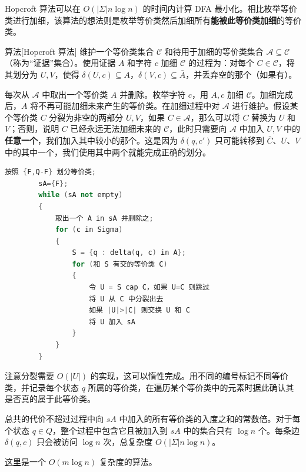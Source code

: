 Hopcroft 算法可以在 $O(|\Sigma|n\log n)$ 的时间内计算 DFA 最小化。相比枚举等价类进行加细，该算法的想法则是枚举等价类然后加细所有\textbf{能被此等价类加细}的等价类。

\begin{descbox}{算法}[Hopcroft 算法]
    维护一个等价类集合 $\mathcal C$ 和待用于加细的等价类集合 $\mathcal A\subseteq \mathcal C$（称为“证据”集合）。使用证据 $A$ 和字符 $c$ 加细 $\mathcal C$ 的过程为：对每个 $C\in \mathcal C$，将其划分为 $U,V$，使得 $\delta(U,c)\subseteq A$，$\delta(V,c)\subseteq \bar A$，并丢弃空的那个（如果有）。
    
    

    每次从 $\mathcal A$ 中取出一个等价类 $A$ 并删除。枚举字符 $c$，用 $A,c$ 加细 $\mathcal C$。加细完成后，$A$ 将不再可能加细未来产生的等价类。在加细过程中对 $\mathcal A$ 进行维护。假设某个等价类 $C$ 分裂为非空的两部分 $U,V$，如果 $C\in \mathcal A$，那么可以将 $C$ 替换为 $U$ 和 $V$；否则，说明 $C$ 已经永远无法加细未来的 $\mathcal C$，此时只需要向 $\mathcal A$ 中加入 $U,V$ 中的\textbf{任意一个}，我们加入其中较小的那个。这是因为 $\delta(q,c')$ 只可能转移到 $\bar C$、$U$、$V$ 中的其中一个，我们使用其中两个就能完成正确的划分。
    \begin{lstlisting}[language=C++]
        按照 {F,Q-F} 划分等价类;
        sA={F};
        while (sA not empty) 
        {
            取出一个 A in sA 并删除之;
            for (c in Sigma)
            {
                S = {q : delta(q, c) in A};
                for (和 S 有交的等价类 C) 
                {
                    令 U = S cap C，如果 U=C 则跳过
                    将 U 从 C 中分裂出去
                    如果 |U|>|C| 则交换 U 和 C
                    将 U 加入 sA
                }
            }
        }
    \end{lstlisting}
    注意分裂需要 $O(|U|)$ 的实现，这可以惰性完成。用不同的编号标记不同等价类，并记录每个状态 $q$ 所属的等价类，在遍历某个等价类中的元素时据此确认其是否真的属于此等价类。
    
    总共的代价不超过过程中向 $sA$ 中加入的所有等价类的入度之和的常数倍。对于每个状态 $q\in Q$，整个过程中包含它且被加入到 $sA$ 中的集合只有 $\log n$ 个。每条边 $\delta(q,c)$ 只会被访问 $\log n$ 次，总复杂度 $O(|\Sigma|n\log n)$。
\end{descbox}
\begin{remark}
    \href{https://arxiv.org/pdf/0802.2826}{这里}是一个 $O(m\log n)$ 复杂度的算法。
\end{remark}

